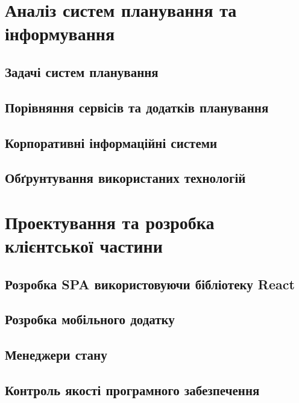 \documentclass[a4paper,14pt]{extarticle} %
\begin{document}


\tableofcontents %
\clearpage


\section{Аналіз систем планування та інформування}

\subsection{Задачі систем планування} 

\subsection{Порівняння сервісів та додатків планування} 



\subsection{Корпоративні інформаційні системи} 

\subsection{Обґрунтування використаних технологій} 


\clearpage
\section{Проектування та розробка клієнтської частини}

\subsection{Розробка SPA використовуючи бібліотеку React}





\subsection{Розробка мобільного додатку}


\subsection{Менеджери стану}


\subsection{Контроль якості програмного забезпечення}


\end{document}
